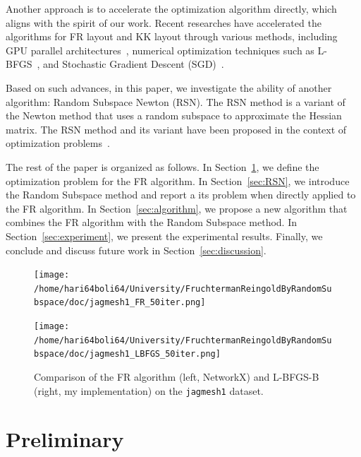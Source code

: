 \documentclass[dvipdfmx,journal]{IEEEtran}
\begin{document}
Another approach is to accelerate the optimization algorithm directly, which aligns with the spirit of our work. Recent researches have accelerated the algorithms for FR layout and KK layout through various methods, including GPU parallel architectures~\cite{gajdosParallelFruchtermanReingold2016}, numerical optimization techniques such as L-BFGS~\cite{6183577}, and Stochastic Gradient Descent (SGD)~\cite{8419285}.

Based on such advances, in this paper, we investigate the ability of another algorithm: Random Subspace Newton (RSN). The RSN method is a variant of the Newton method that uses a random subspace to approximate the Hessian matrix. The RSN method and its variant have been proposed in the context of optimization problems~\cite{NEURIPS2019_bc6dc48b,fujiRandomizedSubspaceRegularized2022,cartisRandomisedSubspaceMethods2022,higuchiFastConvergenceSecondOrder2024}.

The rest of the paper is organized as follows.
In Section~\ref{sec:preliminary}, we define the optimization problem for the FR algorithm.
In Section~\ref{sec:RSN}, we introduce the Random Subspace method and report a its problem when directly applied to the FR algorithm.
In Section~\ref{sec:algorithm}, we propose a new algorithm that combines the FR algorithm with the Random Subspace method.
In Section~\ref{sec:experiment}, we present the experimental results.
Finally, we conclude and discuss future work in Section~\ref{sec:discussion}.

\begin{figure}[t]
  \begin{minipage}{0.49\hsize}
    \centering
    \texttt{[image: /home/hari64boli64/University/FruchtermanReingoldByRandomSubspace/doc/jagmesh1\_FR\_50iter.png]}
  \end{minipage}
  \begin{minipage}{0.49\hsize}
    \centering
    \texttt{[image: /home/hari64boli64/University/FruchtermanReingoldByRandomSubspace/doc/jagmesh1\_LBFGS\_50iter.png]}
  \end{minipage}
  \caption{Comparison of the FR algorithm (left, NetworkX) and L-BFGS-B (right, my implementation) on the \texttt{jagmesh1} dataset.}
\end{figure}

\section{Preliminary}\label{sec:preliminary}
\end{document}
